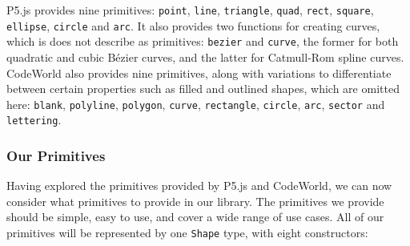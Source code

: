 \documentclass[../main.tex]{subfiles}
\begin{document}
                P5.js provides nine primitives: \verb|point|, \verb|line|, \verb|triangle|,
                    \verb|quad|, \verb|rect|, \verb|square|, \verb|ellipse|, \verb|circle| and
                    \verb|arc|.
                It also provides two functions for creating curves, which is does not describe
                    as primitives: \verb|bezier| and \verb|curve|, the former for both quadratic
                    and cubic Bézier curves, and the latter for Catmull-Rom spline curves.
                CodeWorld also provides nine primitives, along with variations to differentiate
                    between certain properties such as filled and outlined shapes, which are
                    omitted here: \verb|blank|, \verb|polyline|, \verb|polygon|, \verb|curve|,
                    \verb|rectangle|, \verb|circle|, \verb|arc|, \verb|sector| and
                    \verb|lettering|.

            \subsubsection{Our Primitives}
                Having explored the primitives provided by P5.js and CodeWorld, we can now
                    consider what primitives to provide in our library.
                The primitives we provide should be simple, easy to use, and cover a wide range
                    of use cases.
                All of our primitives will be represented by one \verb|Shape| type, with eight constructors:
\end{document}

